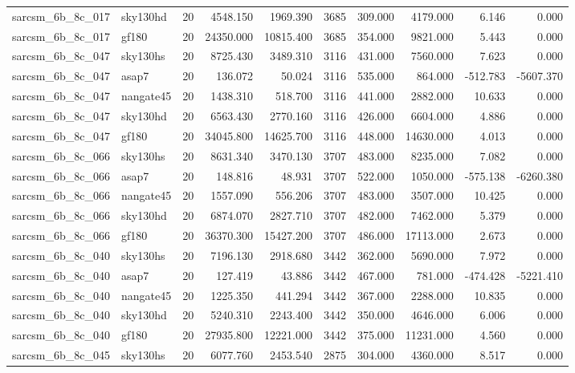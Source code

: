 \begin{longtable}{llrrrrrrrr}
sarcsm\_6b\_8c\_017 & sky130hd & 20 & 4548.150 & 1969.390 & 3685 & 309.000 & 4179.000 & 6.146 & 0.000 \\
sarcsm\_6b\_8c\_017 & gf180 & 20 & 24350.000 & 10815.400 & 3685 & 354.000 & 9821.000 & 5.443 & 0.000 \\
sarcsm\_6b\_8c\_047 & sky130hs & 20 & 8725.430 & 3489.310 & 3116 & 431.000 & 7560.000 & 7.623 & 0.000 \\
sarcsm\_6b\_8c\_047 & asap7 & 20 & 136.072 & 50.024 & 3116 & 535.000 & 864.000 & -512.783 & -5607.370 \\
sarcsm\_6b\_8c\_047 & nangate45 & 20 & 1438.310 & 518.700 & 3116 & 441.000 & 2882.000 & 10.633 & 0.000 \\
sarcsm\_6b\_8c\_047 & sky130hd & 20 & 6563.430 & 2770.160 & 3116 & 426.000 & 6604.000 & 4.886 & 0.000 \\
sarcsm\_6b\_8c\_047 & gf180 & 20 & 34045.800 & 14625.700 & 3116 & 448.000 & 14630.000 & 4.013 & 0.000 \\
sarcsm\_6b\_8c\_066 & sky130hs & 20 & 8631.340 & 3470.130 & 3707 & 483.000 & 8235.000 & 7.082 & 0.000 \\
sarcsm\_6b\_8c\_066 & asap7 & 20 & 148.816 & 48.931 & 3707 & 522.000 & 1050.000 & -575.138 & -6260.380 \\
sarcsm\_6b\_8c\_066 & nangate45 & 20 & 1557.090 & 556.206 & 3707 & 483.000 & 3507.000 & 10.425 & 0.000 \\
sarcsm\_6b\_8c\_066 & sky130hd & 20 & 6874.070 & 2827.710 & 3707 & 482.000 & 7462.000 & 5.379 & 0.000 \\
sarcsm\_6b\_8c\_066 & gf180 & 20 & 36370.300 & 15427.200 & 3707 & 486.000 & 17113.000 & 2.673 & 0.000 \\
sarcsm\_6b\_8c\_040 & sky130hs & 20 & 7196.130 & 2918.680 & 3442 & 362.000 & 5690.000 & 7.972 & 0.000 \\
sarcsm\_6b\_8c\_040 & asap7 & 20 & 127.419 & 43.886 & 3442 & 467.000 & 781.000 & -474.428 & -5221.410 \\
sarcsm\_6b\_8c\_040 & nangate45 & 20 & 1225.350 & 441.294 & 3442 & 367.000 & 2288.000 & 10.835 & 0.000 \\
sarcsm\_6b\_8c\_040 & sky130hd & 20 & 5240.310 & 2243.400 & 3442 & 350.000 & 4646.000 & 6.006 & 0.000 \\
sarcsm\_6b\_8c\_040 & gf180 & 20 & 27935.800 & 12221.000 & 3442 & 375.000 & 11231.000 & 4.560 & 0.000 \\
sarcsm\_6b\_8c\_045 & sky130hs & 20 & 6077.760 & 2453.540 & 2875 & 304.000 & 4360.000 & 8.517 & 0.000 \\

\end{longtable}

